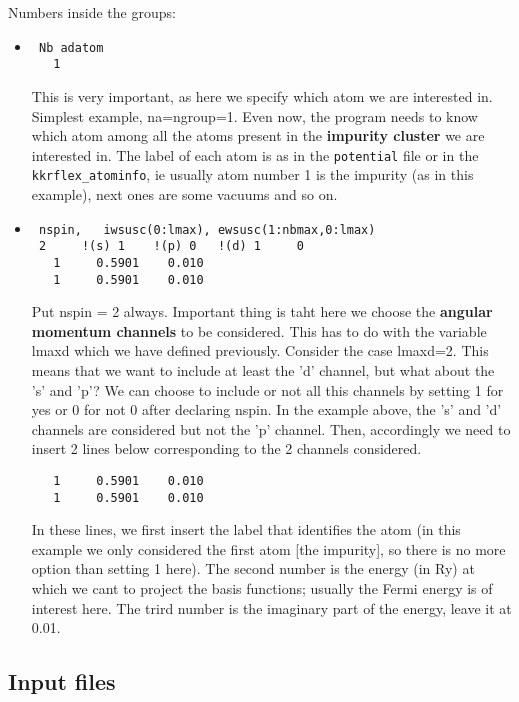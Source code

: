 \documentclass[a4paper,10pt,fullpage]{report}
\begin{document}
Numbers inside the groups:

\begin{itemize}
\item

\begin{verbatim}
 Nb adatom
   1
\end{verbatim}
This is very important, as here we specify which atom we are interested in.
Simplest example, na=ngroup=1. Even now, the program needs to know 
which atom among all the atoms
present in the \textbf{impurity cluster} we are interested in. The label of each atom
is as in the \verb|potential| file or in the \verb|kkrflex_atominfo|, 
ie usually atom number 1 is the impurity (as in this example), 
next ones are some vacuums and so on. 

\item 

\begin{verbatim}
 nspin,   iwsusc(0:lmax), ewsusc(1:nbmax,0:lmax)
 2     !(s) 1    !(p) 0   !(d) 1     0
   1     0.5901    0.010
   1     0.5901    0.010
\end{verbatim}
Put nspin = 2 always. Important thing is taht here we choose
the \textbf{angular momentum channels} to be considered.  
This has to do with the variable lmaxd which we have defined previously.
Consider the case lmaxd=2. This means that we want to include at least the 'd'
channel, but what about the 's' and 'p'? We can choose to include or not all
this channels by setting 1 for yes or 0 for not 0 after declaring nspin.
In the example above, the 's' and 'd' channels are considered  
but not the 'p' channel.  Then, accordingly we need to insert 
2 lines below corresponding to the 2 channels considered.
\begin{verbatim}
   1     0.5901    0.010
   1     0.5901    0.010
\end{verbatim}
In these lines, we first insert the label that identifies the 
atom (in this example we only considered the first atom [the impurity],
so there is no more option than setting 1 here). The second number is the
energy (in Ry) at which we cant to project the basis functions; usually the Fermi energy is 
of interest here. The trird number is the imaginary part of the energy, leave it 
at 0.01.

\end{itemize}


\subsection{Input files}
\end{document}
